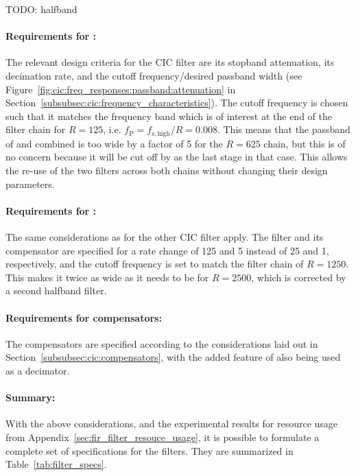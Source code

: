 TODO: halfband

\paragraph{Requirements     for     :} The     relevant     design
criteria    for   the    CIC    filter   are    its   stopband    attenuation,
its   decimation    rate,   and   the   cutoff    frequency/desired   passband
width    (see   Figure~\ref{fig:cic:freq_responses:passband:attenuation}    in
Section~\ref{subsubsec:cic:frequency_characteristics}).  The  cutoff frequency
is chosen such that it matches the  frequency band which is of interest at the
end of the filter chain  for $R=125$, i.e. $f_\mathrm{P} = f_\mathrm{s,high}/R
=  0.008$. This means  that  the passband  of   and  
combined is too wide by a factor of \num{5} for the $R=625$ chain, but this is
of no concern because it will be cut  off by  as the last stage in
that  case. This allows  the  re-use of  the two  filters  across both  chains
without changing their design parameters.

\paragraph{Requirements for :} The same considerations as for the
other CIC  filter apply. The filter  and its  compensator are specified  for a
rate  change  of  \num{125}  and  \num{5} instead  of  \num{25}  and  \num{1},
respectively, and  the cutoff frequency  is set to  match the filter  chain of
$R=1250$. This makes it twice as wide as it needs to be for $R=2500$, which is
corrected by a second halfband filter.

\paragraph{Requirements     for     compensators:} The    compensators     are
specified     according    to     the    considerations     laid    out     in
Section~\ref{subsubsec:cic:compensators},   with   the    added   feature   of
 also being used as a decimator.

\paragraph{Summary:} With  the  above  considerations,  and  the  experimental
results for  resource usage  from Appendix~\ref{sec:fir_filter_resouce_usage},
it  is  possible  to  formulate  a complete  set  of  specifications  for  the
filters. They are summarized in Table~\ref{tab:filter_specs}.

